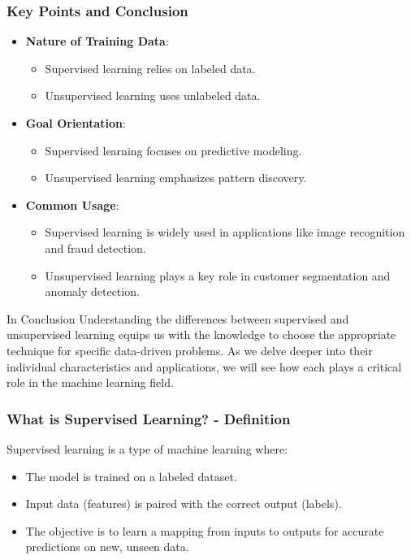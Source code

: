 \documentclass{beamer}
\begin{document}
\begin{frame}[fragile]
    \frametitle{Key Points and Conclusion}
    \begin{itemize}
        \item \textbf{Nature of Training Data}:
        \begin{itemize}
            \item Supervised learning relies on labeled data.
            \item Unsupervised learning uses unlabeled data.
        \end{itemize}

        \item \textbf{Goal Orientation}:
        \begin{itemize}
            \item Supervised learning focuses on predictive modeling.
            \item Unsupervised learning emphasizes pattern discovery.
        \end{itemize}

        \item \textbf{Common Usage}:
        \begin{itemize}
            \item Supervised learning is widely used in applications like image recognition and fraud detection.
            \item Unsupervised learning plays a key role in customer segmentation and anomaly detection.
        \end{itemize}
    \end{itemize}

    \begin{block}{In Conclusion}
        Understanding the differences between supervised and unsupervised learning equips us with the knowledge to choose the appropriate technique for specific data-driven problems. As we delve deeper into their individual characteristics and applications, we will see how each plays a critical role in the machine learning field.
    \end{block}
\end{frame}

\begin{frame}[fragile]
    \frametitle{What is Supervised Learning? - Definition}
    Supervised learning is a type of machine learning where:
    \begin{itemize}
        \item The model is trained on a labeled dataset.
        \item Input data (features) is paired with the correct output (labels).
        \item The objective is to learn a mapping from inputs to outputs for accurate predictions on new, unseen data.
    \end{itemize}
\end{frame}
\end{document}
